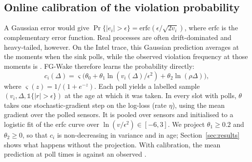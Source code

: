 \documentclass[conference]{IEEEtran}
\newcommand{\sgm}{\varsigma}
\begin{document}
\subsection{Online calibration of the violation probability}
A Gaussian error would give $\Pr\{|e_i|>\epsilon\}=\mathrm{erfc}(\epsilon/\sqrt{2v_i})$,
where $\mathrm{erfc}$ is the complementary error function. Real processes are often drift-dominated and heavy-tailed, however. On the Intel
trace, this Gaussian prediction averages \CalGaussPred{} at the moments when the
sink polls, while the observed violation frequency at those moments is
\CalGaussObs. FG-Wake therefore learns the probability directly:
\begin{equation}\label{eq:calib}
c_i(\Delta)=\sgm\!\big(\theta_0+\theta_1\ln(v_i(\Delta)/\epsilon^2)+\theta_2\ln(\rho\Delta)\big),
\end{equation}
where $\sgm(z)=1/(1+e^{-z})$. Each poll yields a labelled sample
$(v_i,\Delta,\mathbb{1}\{|r|>\epsilon\})$ at the age at which it was taken. In
every slot with polls, $\theta$ takes one stochastic-gradient step on the
log-loss (rate $\eta$), using the mean gradient over the polled sensors. It is
pooled over sensors and initialised to a logistic fit of the erfc curve over
$\ln(v/\epsilon^2)\in[-6,3]$. We
project $\theta_1\ge0.2$ and $\theta_2\ge0$, so that $c_i$ is non-decreasing in
variance and in age; Section~\ref{sec:results} shows what happens without the
projection. With calibration, the mean prediction at poll times is \CalFgPred{}
against an observed \CalFgObs.
\end{document}
